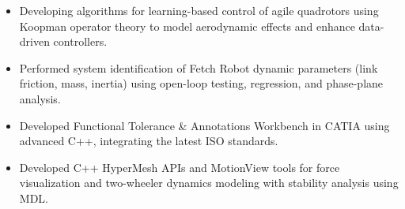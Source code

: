 \documentclass[10pt,a4paper,ragged2e,withhyper]{altacv}
\begin{document}
\begin{itemize}
\item Developing algorithms for learning-based control of agile quadrotors using Koopman operator theory to model aerodynamic effects and enhance data-driven controllers.
\end{itemize}
\vspace{-0.5em}
\divider
{}
\begin{itemize}
\item Performed system identification of Fetch Robot dynamic parameters (link friction, mass, inertia) using open-loop testing, regression, and phase-plane analysis.
\end{itemize}
\vspace{-0.5em}
\divider

\vspace{-0.5em}
\divider

\begin{itemize}
\item Developed Functional Tolerance \& Annotations Workbench in CATIA using advanced C++, integrating the latest ISO standards.
\end{itemize}
\vspace{-0.5em}
\divider
 
\begin{itemize}
\item Developed C++ HyperMesh APIs and MotionView tools for force visualization and two-wheeler dynamics modeling with stability analysis using MDL.
\end{itemize}

\end{document}
